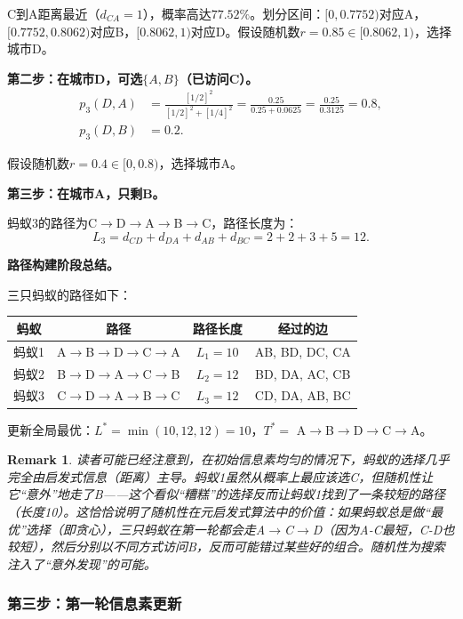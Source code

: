 \documentclass[lang=cn,zihao=-4,a4paper,fontset=windows]{beautybook}
\newtheorem*{remark}{\textbf{Remark}}
\begin{document}
C到A距离最近（$d_{CA}=1$），概率高达$77.52\%$。划分区间：$[0, 0.7752)$对应A，$[0.7752, 0.8062)$对应B，$[0.8062, 1)$对应D。假设随机数$r=0.85 \in [0.8062, 1)$，选择城市D。

\textbf{第二步：在城市D，可选$\{A, B\}$（已访问C）。}
\begin{align*}
p_3(D,A) &= \frac{[1/2]^2}{[1/2]^2 + [1/4]^2} = \frac{0.25}{0.25 + 0.0625} = \frac{0.25}{0.3125} = 0.8, \\[4pt]
p_3(D,B) &= 0.2.
\end{align*}

假设随机数$r=0.4 \in [0, 0.8)$，选择城市A。

\textbf{第三步：在城市A，只剩B。}

蚂蚁3的路径为C$\to$D$\to$A$\to$B$\to$C，路径长度为：
\[
L_3 = d_{CD} + d_{DA} + d_{AB} + d_{BC} = 2 + 2 + 3 + 5 = 12.
\]

\textbf{路径构建阶段总结。}

三只蚂蚁的路径如下：
\begin{center}
\begin{tabular}{cccc}
\toprule
蚂蚁 & 路径 & 路径长度 & 经过的边 \\
\midrule
蚂蚁1 & A$\to$B$\to$D$\to$C$\to$A & $L_1=10$ & AB, BD, DC, CA \\
蚂蚁2 & B$\to$D$\to$A$\to$C$\to$B & $L_2=12$ & BD, DA, AC, CB \\
蚂蚁3 & C$\to$D$\to$A$\to$B$\to$C & $L_3=12$ & CD, DA, AB, BC \\
\bottomrule
\end{tabular}
\end{center}

更新全局最优：$L^* = \min(10, 12, 12) = 10$，$T^* =$ A$\to$B$\to$D$\to$C$\to$A。

\begin{remark}
读者可能已经注意到，在初始信息素均匀的情况下，蚂蚁的选择几乎完全由启发式信息（距离）主导。蚂蚁1虽然从概率上最应该选C，但随机性让它“意外”地走了B——这个看似“糟糕”的选择反而让蚂蚁1找到了一条较短的路径（长度10）。这恰恰说明了随机性在元启发式算法中的价值：如果蚂蚁总是做“最优”选择（即贪心），三只蚂蚁在第一轮都会走A$\to$C$\to$D（因为A-C最短，C-D也较短），然后分别以不同方式访问B，反而可能错过某些好的组合。随机性为搜索注入了“意外发现”的可能。
\end{remark}

\subsubsection{第三步：第一轮信息素更新}
\end{document}

